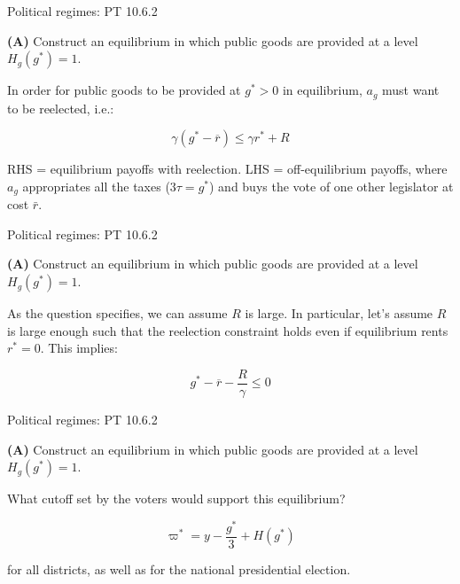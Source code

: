 \documentclass[11pt,aspectratio=169]{beamer}
\begin{document}
\begin{frame}{Political regimes: PT 10.6.2}

\begin{tcolorbox}
\textbf{(A)} Construct an equilibrium in which public goods are provided at a level $H_g(g^*) = 1$.
\end{tcolorbox}

\pause

In order for public goods to be provided at $g^*>0$ in equilibrium, $a_g$ must want to be reelected, i.e.: 

$$ \gamma (g^*-\overline{r} ) \leq \gamma r^{*}+R $$

\pause

\alert{RHS} = equilibrium payoffs with reelection.
\newline \alert{LHS} = off-equilibrium payoffs, where $a_g$ appropriates all the taxes ($3\tau = g^*$) and buys the vote of one other legislator at cost $\bar{r}$.


\end{frame}

\begin{frame}{Political regimes: PT 10.6.2}

\begin{tcolorbox}
\textbf{(A)} Construct an equilibrium in which public goods are provided at a level $H_g(g^*) = 1$.
\end{tcolorbox}

As the question specifies, we can assume $R$ is large. In particular, let's assume $R$ is large enough such that the reelection constraint holds even if equilibrium rents $r^* = 0$. \pause This implies:

$$ g^{*}-\overline{r}-\frac{R}{\gamma} \leq 0 $$


\end{frame}

\begin{frame}{Political regimes: PT 10.6.2}

\begin{tcolorbox}
\textbf{(A)} Construct an equilibrium in which public goods are provided at a level $H_g(g^*) = 1$.
\end{tcolorbox}

What cutoff set by the voters would support this equilibrium?

$$ \varpi^{*}=y-\frac{g^{*}}{3}+H\left(g^{*}\right) $$

for all districts, as well as for the national presidential election.


\end{frame}
\end{document}
